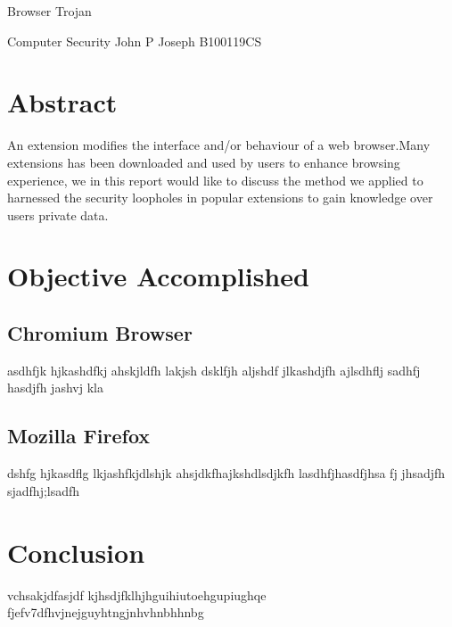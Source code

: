 \documentclass[12pt]{article}
\date{}
\begin{document}
\begin{center}
\begin{Huge}
Browser Trojan \linebreak
\end{Huge}
Computer Security \linebreak
 John P Joseph 
 B100119CS



\end{center}


\section*{Abstract}
An extension modifies the interface and/or behaviour of a web browser.Many extensions has been downloaded and used by users to enhance browsing experience, we in this report would like to discuss the method we applied to harnessed the security loopholes in popular extensions to gain knowledge over users private data.

\section*{Objective Accomplished}
\subsection*{Chromium Browser}
asdhfjk hjkashdfkj ahskjldfh lakjsh dsklfjh aljshdf jlkashdjfh ajlsdhflj sadhfj hasdjfh jashvj kla

\subsection*{Mozilla Firefox}
dshfg hjkasdflg lkjashfkjdlshjk ahsjdkfhajkshdlsdjkfh lasdhfjhasdfjhsa fj jhsadjfh sjadfhj;lsadfh 
\section*{Conclusion}
 vchsakjdfasjdf kjhsdjfklhjhguihiutoehgupiughqe fjefv7dfhvjnejguyhtngjnhvhnbhhnbg
\end{document}
